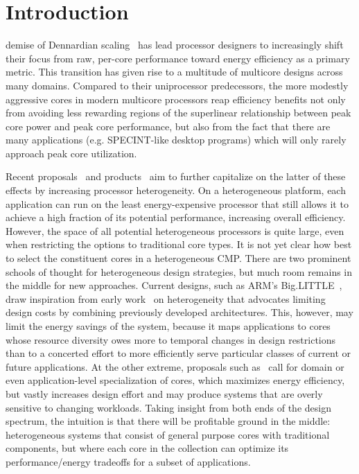 \section{Introduction}
\label{sec:introduction}

 demise of Dennardian scaling~\cite{Dennard74-JSSC-MOSFET_Scaling}
has lead processor designers to increasingly shift their focus from
raw, per-core performance toward energy efficiency as a primary
metric. This transition has given rise to a multitude of multicore
designs across many domains. Compared to their uniprocessor
predecessors, the more modestly aggressive cores in modern multicore
processors reap efficiency benefits not only from avoiding less
rewarding regions of the superlinear relationship between peak core
power and peak core performance, but also from the fact that there are
many applications (e.g. SPECINT-like desktop programs) which will only
rarely approach peak core utilization.

Recent proposals~\cite{Lukefahr12-MICRO-CompositeCores,variable2011multi} and products~\cite{ARM11-WhitePaper-BigLittle} aim to
further capitalize on the latter of these effects by increasing
processor heterogeneity. On a heterogeneous platform, each application
can run on the least energy-expensive processor that still
allows it to achieve a high fraction of its potential performance,
increasing overall efficiency. However, the space of all potential
heterogeneous processors is quite large, even when restricting the
options to traditional core types. It is not yet clear how best to
select the constituent cores in a heterogeneous CMP.
There are two prominent schools of thought for heterogeneous design
strategies, but much room remains in the middle for new
approaches. Current designs, such as ARM's
Big.LITTLE~\cite{ARM11-WhitePaper-BigLittle}, draw inspiration from
early work~\cite{Kumar03-SIHM,Kumar06-PACT-SIHM,Kumar04-SIHM} on
heterogeneity that advocates limiting design costs by combining
previously developed architectures. This, however, may limit the energy
savings of the system, because it maps applications to cores whose
resource diversity owes more to temporal changes in design
restrictions than to a concerted effort to more efficiently serve
particular classes of current or future applications. At the other
extreme, proposals such
as~\cite{Clark05-ISCA-CustomISA,Clark08-ISCA-VEAL,Goulding11-IEEEMICRO-GreenDroid,Venkatesh10-ASPLOS-CCores}
call for domain or even application-level specialization of cores,
which maximizes energy efficiency, but vastly increases design effort
and may produce systems that are overly sensitive to changing
workloads. Taking insight from both ends of the design spectrum, the
intuition is that there will be profitable ground in the middle:
heterogeneous systems that consist of general purpose cores with
traditional components, but where each core in the collection can
optimize its performance/energy tradeoffs for a subset of
applications.

